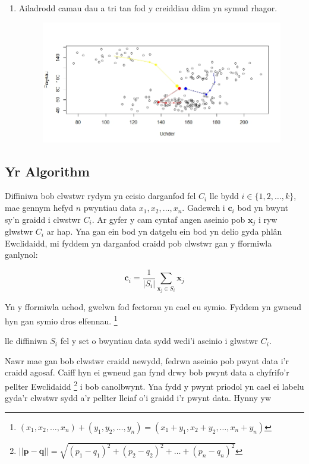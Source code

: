 \begin{enumerate}
\item Ailadrodd camau dau a tri tan fod y creiddiau ddim yn symud rhagor.

\begin{figure}[H]
\begin{center}
\includegraphics[width=0.5\linewidth]{../img/Convergence4.jpeg}
\end{center}
\end{figure}

\end{enumerate}  

\subsection{Yr Algorithm}

Diffiniwn bob clwstwr rydym yn ceisio darganfod fel $C_i$ lle bydd $i \in \{ 1, 2, \dots, k\}$, mae gennym hefyd $n$ pwyntiau data $x_1, x_2, \dots, x_n$. Gadewch i $\mathbf{c}_i$ bod yn bwynt sy'n graidd i clwstwr $C_i$. Ar gyfer y cam cyntaf angen aseinio pob $\mathbf{x}_j$ i ryw glwstwr $C_i$ ar hap. Yna gan ein bod yn datgelu ein bod yn delio gyda phl\^{a}n Ewclidaidd, mi fyddem yn darganfod craidd pob clwstwr gan y fformiwla ganlynol:

\begin{equation}
\mathbf{c}_i = \frac{1}{|S_i|}\sum_{\mathbf{x}_j \in S_i} {\mathbf{x}_j}
\end{equation}

Yn y fformiwla uchod, gwelwn fod fectorau yn cael eu symio. Fyddem yn gwneud hyn gan symio dros elfennau. \footnote{$ (x_1,x_2,\dots,x_n) + (y_1,y_2,\dots,y_n) = (x_1 + y_1, x_2 + y_2,\dots,x_n + y_n)$}

lle diffiniwn $S_i$ fel y set o bwyntiau data sydd wedi'i aseinio i glwstwr $C_i$.

Nawr mae gan bob clwstwr craidd newydd, fedrwn aseinio pob pwynt data i'r craidd agosaf. Caiff hyn ei gwneud gan fynd drwy bob pwynt data a chyfrifo'r pellter Ewclidaidd \footnote{$|| \mathbf{p} - \mathbf{q} || = \sqrt{(p_1-q_1)^2+(p_2-q_2)^2+\dots+(p_n-q_n)^2}$} i bob canolbwynt. Yna fydd y pwynt priodol yn cael ei labelu gyda'r clwstwr sydd a'r pellter lleiaf o'i graidd i'r pwynt data. Hynny yw

